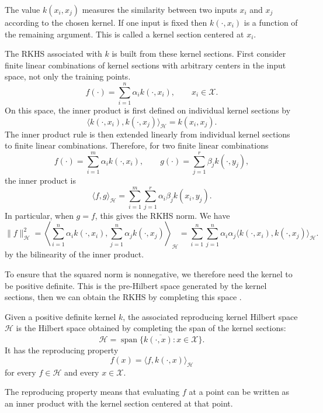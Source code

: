 The value $k(x_i,x_j)$ measures the similarity between two inputs $x_i$ and $x_j$ according to the chosen kernel. If one input is fixed then $k(\cdot,x_i)$ is a function of the remaining argument. This is called a kernel section centered at $x_i$.

The RKHS associated with $k$ is built from these kernel sections. First consider finite linear combinations of kernel sections with arbitrary centers in the input space, not only the training points.
\[
f(\cdot)=\sum_{i=1}^n \alpha_i k(\cdot,x_i), \qquad x_i\in\mathcal X.
\]
On this space, the inner product is first defined on individual kernel sections by
\[
\langle k(\cdot,x_i),k(\cdot,x_j)\rangle_{\mathcal H}=k(x_i,x_j).
\]
The inner product rule is then extended linearly from individual kernel sections to finite linear combinations. Therefore, for two finite linear combinations
\[
f(\cdot)=\sum_{i=1}^m \alpha_i k(\cdot,x_i),\qquad g(\cdot)=\sum_{j=1}^r \beta_j k(\cdot,y_j),
\]
the inner product is
\[
\langle f,g\rangle_{\mathcal H} =\sum_{i=1}^m\sum_{j=1}^r \alpha_i \beta_j k(x_i,y_j).
\]
In particular, when $g=f$, this gives the RKHS norm. We have
\[
\|f\|_{\mathcal{H}}^2=\left\langle\sum_{i=1}^n\alpha_i k(\cdot,x_i),\sum_{j=1}^n\alpha_j k(\cdot,x_j)\right\rangle_{\mathcal{H}} =\sum_{i=1}^n\sum_{j=1}^n\alpha_i\alpha_j\langle k(\cdot,x_i),k(\cdot,x_j)\rangle_{\mathcal{H}}.
\]
by the bilinearity of the inner product. 

To ensure that the squared norm is nonnegative, we therefore need the kernel to be positive definite. This is the pre-Hilbert space generated by the kernel sections, then we can obtain the RKHS by completing this space \citep{aronszajn1950theory,hofmann2008kernel,zhu2023rkhs}. 

\begin{definition}
Given a positive definite kernel $k$, the associated reproducing kernel Hilbert space $\mathcal H$ is the Hilbert space obtained by completing the span of the kernel sections:
\[
\mathcal H=\overline{\operatorname{span} \{k(\cdot,x):x\in\mathcal X\}}.
\]
It has the reproducing property
\[
f(x)=\langle f,k(\cdot,x)\rangle_{\mathcal H}
\]
for every $f\in\mathcal H$ and every $x\in\mathcal X$.
\end{definition}

The reproducing property means that evaluating $f$ at a point can be written as an inner product with the kernel section centered at that point.

